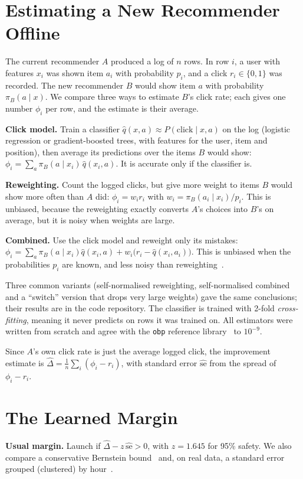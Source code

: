 \documentclass[conference]{IEEEtran}
\newcommand{\Dhat}{\widehat{\Delta}}
\newcommand{\se}{\widehat{\mathrm{se}}}
\begin{document}
\section{Estimating a New Recommender Offline}
The current recommender $A$ produced a log of $n$ rows. In row $i$, a user with features $x_i$ was shown item $a_i$ with probability $p_i$, and a click $r_i\in\{0,1\}$ was recorded. The new recommender $B$ would show item $a$ with probability $\pi_B(a\mid x)$. We compare three ways to estimate $B$'s click rate; each gives one number $\phi_i$ per row, and the estimate is their average.

\textbf{Click model.} Train a classifier $\hat q(x,a)\approx P(\text{click}\mid x,a)$ on the log (logistic regression or gradient-boosted trees, with features for the user, item and position), then average its predictions over the items $B$ would show: $\phi_i = \sum_a \pi_B(a\mid x_i)\,\hat q(x_i,a)$. It is accurate only if the classifier is.

\textbf{Reweighting.} Count the logged clicks, but give more weight to items $B$ would show more often than $A$ did: $\phi_i = w_i r_i$ with $w_i = \pi_B(a_i\mid x_i)/p_i$. This is unbiased, because the reweighting exactly converts $A$'s choices into $B$'s on average, but it is noisy when weights are large.

\textbf{Combined.} Use the click model and reweight only its mistakes: $\phi_i = \sum_a \pi_B(a\mid x_i)\hat q(x_i,a) + w_i\big(r_i-\hat q(x_i,a_i)\big)$. This is unbiased when the probabilities $p_i$ are known, and less noisy than reweighting~\cite{dudik2011dr}.

Three common variants (self-normalised reweighting, self-normalised combined and a ``switch'' version that drops very large weights) gave the same conclusions; their results are in the code repository. The classifier is trained with 2-fold \emph{cross-fitting}, meaning it never predicts on rows it was trained on. All estimators were written from scratch and agree with the \texttt{obp} reference library~\cite{saito2021obd} to $10^{-9}$.

Since $A$'s own click rate is just the average logged click, the improvement estimate is $\Dhat = \frac1n\sum_i (\phi_i - r_i)$, with standard error $\se$ from the spread of $\phi_i - r_i$.

\section{The Learned Margin}
\textbf{Usual margin.} Launch if $\Dhat - z\,\se > 0$, with $z=1.645$ for 95\% safety. We also compare a conservative Bernstein bound~\cite{maurer2009eb} and, on real data, a standard error grouped (clustered) by hour~\cite{cameron2015cluster}.
\end{document}
